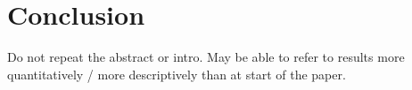 \section{Conclusion}
\label{sec:conclusion}
Do not repeat the abstract or intro.
May be able to refer to results more quantitatively / more descriptively than at start of the paper.
